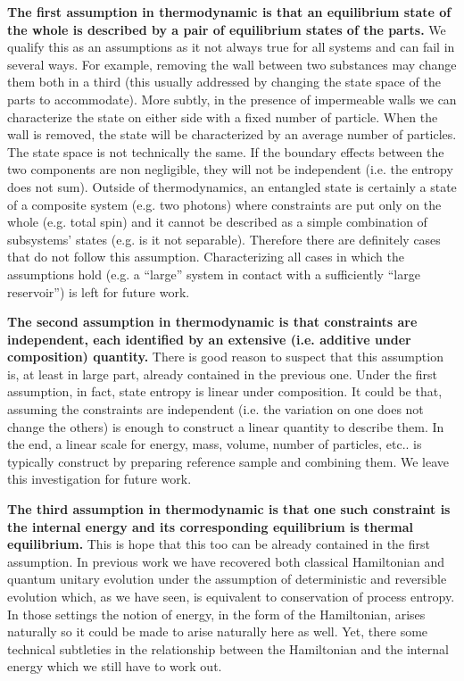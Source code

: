 \documentclass[letterpaper]{article}
\begin{document}
\textbf{The first assumption in thermodynamic is that an equilibrium state of the whole is described by a pair of equilibrium states of the parts.} We qualify this as an assumptions as it not always true for all systems and can fail in several ways. For example, removing the wall between two substances may change them both in a third (this usually addressed by changing the state space of the parts to accommodate). More subtly, in the presence of impermeable walls we can characterize the state on either side with a fixed number of particle. When the wall is removed, the state will be characterized by an average number of particles. The state space is not technically the same. If the boundary effects between the two components are non negligible, they will not be independent (i.e. the entropy does not sum). Outside of thermodynamics, an entangled state is certainly a state of a composite system (e.g. two photons) where constraints are put only on the whole (e.g. total spin) and it cannot be described as a simple combination of subsystems' states (e.g. is it not separable). Therefore there are definitely cases that do not follow this assumption. Characterizing all cases in which the assumptions hold (e.g. a ``large'' system in contact with a sufficiently ``large reservoir'') is left for future work.

\textbf{The second assumption in thermodynamic is that constraints are independent, each identified by an extensive (i.e. additive under composition) quantity.} There is good reason to suspect that this assumption is, at least in large part, already contained in the previous one. Under the first assumption, in fact, state entropy is linear under composition. It could be that, assuming the constraints are independent (i.e. the variation on one does not change the others) is enough to construct a linear quantity to describe them. In the end, a linear scale for energy, mass, volume, number of particles, etc.. is typically construct by preparing reference sample and combining them. We leave this investigation for future work.

\textbf{The third assumption in thermodynamic is that one such constraint is the internal energy and its corresponding equilibrium is thermal equilibrium.} This is hope that this too can be already contained in the first assumption. In previous work we have recovered both classical Hamiltonian and quantum unitary evolution under the assumption of deterministic and reversible evolution which, as we have seen, is equivalent to conservation of process entropy. In those settings the notion of energy, in the form of the Hamiltonian, arises naturally so it could be made to arise naturally here as well. Yet, there some technical subtleties in the relationship between the Hamiltonian and the internal energy which we still have to work out.
\end{document}
